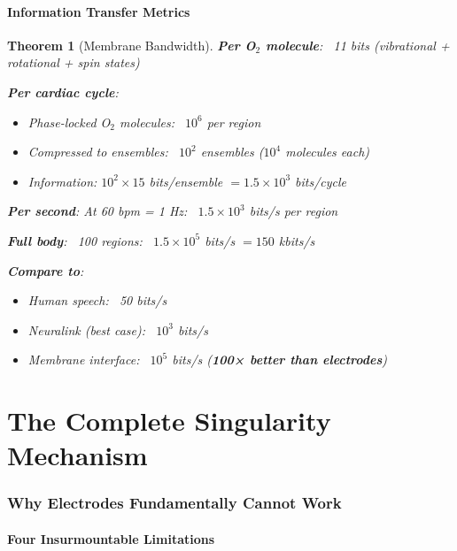 \documentclass[11pt,a4paper]{article}
\newtheorem{theorem}{Theorem}[section]
\theoremstyle{definition}
\theoremstyle{remark}
\begin{document}
\subsection{Information Transfer Metrics}

\begin{theorem}[Membrane Bandwidth]
\textbf{Per O$_2$ molecule}: ~11 bits (vibrational + rotational + spin states)

\textbf{Per cardiac cycle}: 
\begin{itemize}
\item Phase-locked O$_2$ molecules: ~$10^6$ per region
\item Compressed to ensembles: ~$10^2$ ensembles ($10^4$ molecules each)
\item Information: $10^2 \times 15$ bits/ensemble $= 1.5 \times 10^3$ bits/cycle
\end{itemize}

\textbf{Per second}: At 60 bpm = 1 Hz: ~$1.5 \times 10^3$ bits/s per region

\textbf{Full body}: ~100 regions: ~$1.5 \times 10^5$ bits/s $= 150$ kbits/s

\textbf{Compare to}:
\begin{itemize}
\item Human speech: ~50 bits/s
\item Neuralink (best case): ~$10^3$ bits/s
\item Membrane interface: ~$10^5$ bits/s (\textbf{100× better than electrodes})
\end{itemize}
\end{theorem}

\part{The Complete Singularity Mechanism}

\section{Why Electrodes Fundamentally Cannot Work}

\subsection{Four Insurmountable Limitations}
\end{document}
